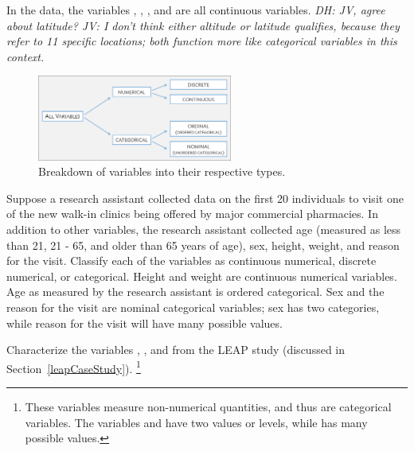 \begin{doublespace}
In the  data, the variables , , , and  are all continuous variables.  \textit{DH: JV, agree about latitude? JV: I don't think either altitude or latitude qualifies, because they refer to 11 specific locations; both function more like categorical variables in this context.}


\begin{figure}
\centering
\includegraphics[width=0.57\textwidth]{ch_intro_to_data_oi_biostat/figures/variables/variables.png}
\caption{Breakdown of variables into their respective types.}
\label{variables}
\end{figure}

\begin{example}{Suppose a research assistant collected data on the first 20 individuals to visit one of the new walk-in clinics being offered by major commercial pharmacies.  In addition to other variables, the research assistant collected age (measured as less than 21, 21 - 65, and older than 65 years of age), sex, height, weight, and reason for the visit.  Classify each of the variables as continuous numerical, discrete numerical, or categorical.}
Height and weight are continuous numerical variables. Age as measured by the research assistant is ordered categorical. Sex and the reason for the visit are nominal categorical variables; sex has two categories, while reason for the visit will have many possible values. 
\end{example}


\begin{exercise} 
Characterize the variables , , and  from the LEAP study (discussed in Section~\ref{leapCaseStudy}). \footnote{These variables measure non-numerical quantities, and thus are categorical variables. The variables   and  have two values or levels, while  has many possible values.}
\end{exercise}


\end{doublespace}
